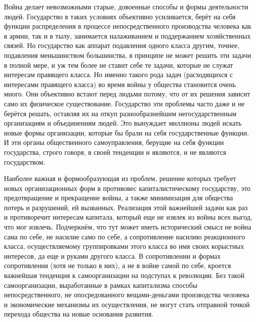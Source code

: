 \documentclass[12pt,a4paper,openany]{book}
\begin{document}
Война делает невозможными старые, довоенные способы и формы деятельности людей. Государство в таких условиях объективно усиливается, берёт на себя функции распределения в процессе непосредственного производства человека как в армии, так и в тылу, занимается налаживанием и поддержанием хозяйственных связей. Но государство как аппарат подавления одного класса другим, точнее, подавления меньшинством большинства, в принципе не может решить эти задачи в полной мере, и уж тем более не ставит себе те задачи, которые не служат интересам правящего класса. Но именно такого рода задач (расходящихся с интересами правящего класса) во время войны у общества становится очень много. Они объективно встают перед людьми потому, что от их решения зависит само их физическое существование. Государство эти проблемы часто даже и не берётся решать, оставляя их на откуп разнообразнейшим негосударственным организациям и объединениям людей. Это вынуждает миллионы людей искать новые формы организации, которые бы брали на себя государственные функции. И эти органы общественного самоуправления, берущие на себя функции государства, строго говоря, в своей тенденции и являются, и не являются государством.

Наиболее важная и формообразующая из проблем, решение которых требует новых организационных форм в противовес капиталистическому государству, это предотвращение и прекращение войны, а также минимизация для общества потерь и разрушений, ей вызванных. Реализация этой важнейшей задачи как раз и противоречит интересам капитала, который еще не извлек из войны всех выгод, что мог извлечь. Подчеркнём, что тут может иметь исторический смысл не война сама по себе, не насилие само по себе, а сопротивление насилию реакционного класса, осуществляемому группировками этого класса во имя своих корыстных интересов, да еще и руками другого класса. В сопротивлении и формах сопротивления (хотя не только в них), а не в войне самой по себе, кроется важнейшая тенденция к самоорганизации на подступах к революции. Без такой самоорганизации, выработанные в рамках капитализма способы непосредственного, не опосредованного вещами-деньгами производства человека и экономические механизмы их осуществления, не могут стать отправной точкой перехода общества на новые основания развития.
\end{document}
